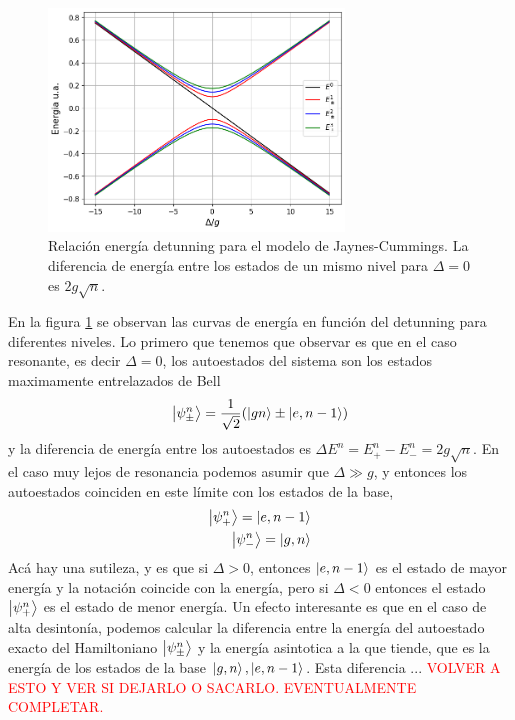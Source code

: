 \begin{figure}
    \centering
    \includegraphics[width=0.7\textwidth]{figuras/ch3/relacion energia detunning jcm simple.png}
    \caption{Relaci\'on energ\'ia detunning para el modelo de Jaynes-Cummings. La diferencia de energ\'ia entre los estados de un mismo nivel para $\Delta=0$ es $2g\sqrt{n}$.}
    \label{fig:relación energia detunning jcm1}
\end{figure}
En la figura \ref{fig:relación energia detunning jcm1} se observan las curvas de energ\'ia en funci\'on del detunning para diferentes niveles. Lo primero que tenemos que observar es que en el caso resonante, es decir $\Delta=0$, los autoestados del sistema son los estados maximamente entrelazados de Bell
\begin{equation}
    \ket{\psi_\pm^n}=\frac{1}{\sqrt{2}}(\ket{gn}\pm\ket{e,n-1})
\end{equation} 
y la diferencia de energ\'ia entre los autoestados es $\Delta E^n =E^n_+-E^n_-=2g\sqrt{n}$. En el caso muy lejos de resonancia podemos asumir que $\Delta \gg g $, y entonces los autoestados coinciden en este l\'imite con los estados de la base, 
\begin{equation}
    \begin{aligned}
        \ket{\psi^n_+}=\ket{e,n-1} \\
        \ket{\psi^n_-}=\ket{g,n}
    \end{aligned}
\end{equation}
Ac\'a hay una sutileza, y es que si $\Delta>0$, entonces $\ket{e,n-1}$ es el estado de mayor energ\'ia y la notaci\'on coincide con la energ\'ia, pero si $\Delta<0$ entonces el estado $\ket{\psi^n_+}$ es el estado de menor energ\'ia. 
Un efecto interesante es que en el caso de alta desinton\'ia, podemos calcular la diferencia entre la energía del autoestado exacto del Hamiltoniano $\ket{\psi_\pm^n}$ y la energía asintotica a la que tiende, que es la energía de los estados de la base $\ket{g,n},\ket{e,n-1}$. Esta diferencia ... \textcolor{red}{VOLVER A ESTO Y VER SI DEJARLO O SACARLO. EVENTUALMENTE COMPLETAR.}
